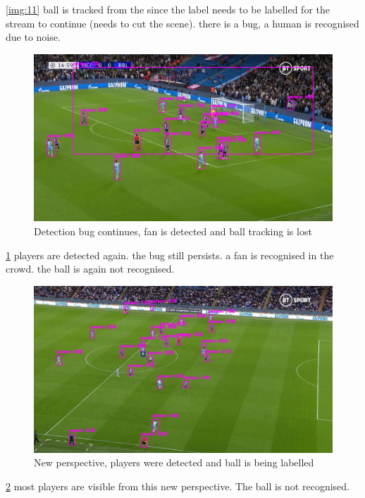 \documentclass[
11pt,
twoside
]{report}
\begin{document}
\ref{img:11} ball is
tracked from the since the label needs to be labelled for the stream to continue (needs to cut the scene). there is a bug, a human is recognised due to noise.
\begin{figure}[H]
    \includegraphics[keepaspectratio, width=\columnwidth]{Screenshot_2022-03-03_23-08-00.png}
    \caption{Detection bug continues, fan is detected and ball tracking is lost}
    \label{img:12}
\end{figure}
\ref{img:12} players
are detected again. the bug still persists. a fan is recognised in the crowd. the ball is again not recognised.
\begin{figure}[H]
    \includegraphics[keepaspectratio, width=\columnwidth]{Screenshot_2022-03-03_23-09-45.png}
    \caption{New perspective, players were detected and ball is being labelled}
    \label{img:13}
\end{figure}
\ref{img:13} most
players are visible from this new perspective. The ball is not recognised.
\end{document}
